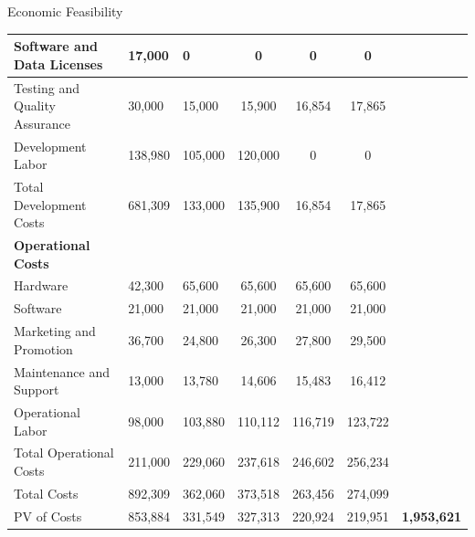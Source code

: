 \documentclass[aspectratio=169]{beamer}
\begin{document}
\begin{frame}{Economic Feasibility}
{\begin{tabular}{|l|l|l|c|c|c|c|}
            \hline
            Software and Data Licenses     & 17,000                              & 0         & 0         & 0         & 0         &                    \\
            \hline
            Testing and Quality Assurance  & 30,000                              & 15,000    & 15,900    & 16,854    & 17,865    &                    \\
            \hline
            Development Labor              & 138,980                             & 105,000   & 120,000   & 0         & 0         &                    \\
            \hline
            Total Development Costs        & 681,309                             & 133,000   & 135,900   & 16,854    & 17,865    &                    \\
            \hline
            \textbf{Operational Costs}     &                                     &           &           &           &           &                    \\
            \hline
            Hardware                       & 42,300                              & 65,600    & 65,600    & 65,600    & 65,600    &                    \\
            \hline
            Software                       & 21,000                              & 21,000    & 21,000    & 21,000    & 21,000    &                    \\
            \hline
            Marketing and Promotion        & 36,700                              & 24,800    & 26,300    & 27,800    & 29,500    &                    \\
            \hline
            Maintenance and Support        & 13,000                              & 13,780    & 14,606    & 15,483    & 16,412    &                    \\
            \hline
            Operational Labor              & 98,000                              & 103,880   & 110,112   & 116,719   & 123,722   &                    \\
            \hline
            Total Operational Costs        & 211,000                             & 229,060   & 237,618   & 246,602   & 256,234   &                    \\
            \hline
            Total Costs                    & 892,309                             & 362,060   & 373,518   & 263,456   & 274,099   &                    \\
            \hline
            PV of Costs                    & 853,884                             & 331,549   & 327,313   & 220,924   & 219,951   & \textbf{1,953,621} \\

\end{tabular}}
\end{frame}
\end{document}
